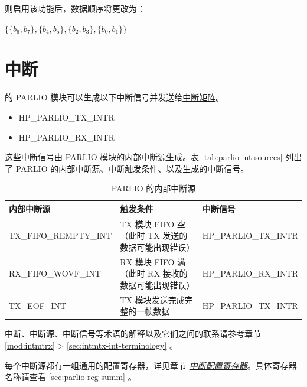 \documentclass[main\_\_CN.tex]{subfiles}
\begin{document}
则启用该功能后，数据顺序将更改为：

\begin{center}
$\{ \{ b_{6}, b_{7} \}, \{ b_{4}, b_{5} \}, \{ b_{2}, b_{3} \}, \{ b_{0}, b_{1} \} \}$
\end{center}



\section{中断} \label{sec:parlio-interrupts}

\chipname{} 的 PARLIO 模块可以生成以下中断信号并发送给\hyperref[mod:intmtrx]{中断矩阵}。

    \begin{itemize}
        \item HP\_PARLIO\_TX\_INTR
        \item HP\_PARLIO\_RX\_INTR
    \end{itemize}

这些中断信号由 PARLIO 模块的内部中断源生成。表 \ref{tab:parlio-int-sources} 列出了 PARLIO 的内部中断源、中断触发条件、以及生成的中断信号。

\begin{longtable}{ | L{3.8cm} | L{8.4cm} | L{3.4cm} | }
\caption{PARLIO 的内部中断源} \label{tab:parlio-int-sources}
\\ \hline
{}
\textbf{内部中断源} & \textbf{触发条件}  &  \textbf{中断信号}\\ \hline
\label{int:TXFIFOREMPTYINT}TX\_FIFO\_REMPTY\_INT  &  TX 模块 FIFO 空（此时 TX 发送的数据可能出现错误） &  HP\_PARLIO\_TX\_INTR \\ \hline
\label{int:RXFIFOWOVFINT}RX\_FIFO\_WOVF\_INT &  RX 模块 FIFO 满（此时 RX 接收的数据可能出现错误） & HP\_PARLIO\_RX\_INTR \\ \hline
\label{int:TXEOFINT}TX\_EOF\_INT &  TX 模块发送完成完整的一帧数据 & HP\_PARLIO\_TX\_INTR \\ \hline
\end{longtable}

\begin{tiplisting}
中断、中断源、中断信号等术语的解释以及它们之间的联系请参考章节 \ref{mod:intmtrx} \textit{} > \ref{sec:intmtx-int-terminology} \textit{}。
\end{tiplisting}

每个中断源都有一组通用的配置寄存器，详见章节 \hyperref[interrupt-config-registers]{\textit{中断配置寄存器}}。具体寄存器名称请查看 \ref{sec:parlio-reg-summ} \textit{}。
\end{document}
